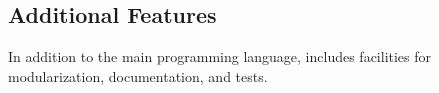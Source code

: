 \subsection{Additional Features}

In addition to the main programming language, \Trilogy{} includes facilities for
modularization, documentation, and tests.
